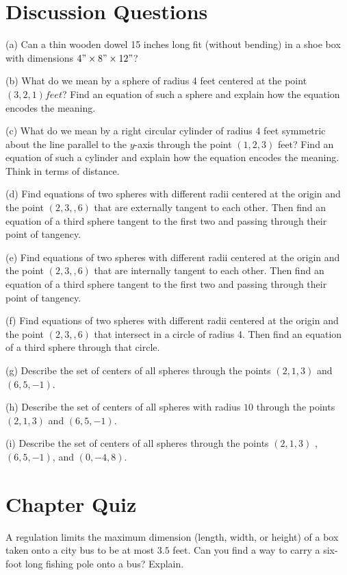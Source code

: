 \documentclass{ximera}
\begin{document}
\section{Discussion Questions}

\begin{question} \label{Q4934:Space}
(a) Can a thin wooden dowel 15 inches long fit (without bending) in a shoe box with dimensions $4"\times 8"\times 12"$?

(b) What do we mean by a sphere of radius 4 feet centered at the point $(3,2,1) feet$? Find an equation of such a sphere and explain how the equation encodes the meaning.

(c) What do we mean by a right circular cylinder of radius 4 feet symmetric about the line parallel to the $y$-axis through the point $(1,2,3)$ feet? Find an equation of such a cylinder and explain how the equation encodes the meaning. Think in terms of distance.

(d) Find equations of two spheres with different radii centered at the origin and the point $(2,3,,6)$ that are externally tangent to each other. Then find an equation of a third sphere tangent to the first two and passing through their point of tangency.

(e) Find equations of two spheres with different radii centered at the origin and the point $(2,3,,6)$ that are internally tangent to each other. Then find an equation of a third sphere tangent to the first two and passing through their point of tangency.

(f) Find equations of two spheres with different radii centered at the origin and the point $(2,3,,6)$ that intersect in a circle of radius 4. Then find an equation of a third sphere through that circle.

(g) Describe the set of centers of all spheres through the points $(2,1,3)$ and $(6,5,-1)$.

(h) Describe the set of centers of all spheres with radius $10$ through the points $(2,1,3)$ and $(6,5,-1)$.

(i) Describe the set of centers of all spheres through the points $(2,1,3)$ , $(6,5,-1)$, and $(0,-4,8)$.

\end{question}


\section*{Chapter Quiz}

\begin{question}  \label{Q:943r34r34}
A regulation limits the maximum dimension (length, width, or height) of a box taken onto a city bus to be at most $3.5$ feet. Can you find a way to carry a six-foot long fishing pole onto a bus? Explain.
\end{question}
\end{document}
